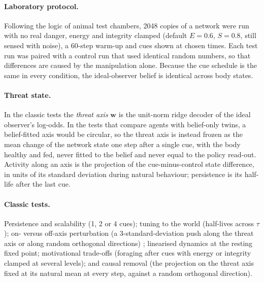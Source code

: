 \documentclass[11pt]{article}
\newcommand{\threat}{\mathbf{w}}
\begin{document}
\paragraph{Laboratory protocol.} Following the logic of animal test chambers, 2048 copies of a network were run with no real danger, energy and integrity clamped (default $E=0.6$, $S=0.8$, still sensed with noise), a 60-step warm-up and cues shown at chosen times. Each test run was paired with a control run that used identical random numbers, so that differences are caused by the manipulation alone. Because the cue schedule is the same in every condition, the ideal-observer belief is identical across body states.

\paragraph{Threat state.} In the classic tests the \emph{threat axis} $\threat$ is the unit-norm ridge decoder of the ideal observer's log-odds. In the tests that compare agents with belief-only twins, a belief-fitted axis would be circular, so the threat axis is instead frozen as the mean change of the network state one step after a single cue, with the body healthy and fed, never fitted to the belief and never equal to the policy read-out. Activity along an axis is the projection of the cue-minus-control state difference, in units of its standard deviation during natural behaviour; persistence is its half-life after the last cue.

\paragraph{Classic tests.} Persistence and scalability (1, 2 or 4 cues); tuning to the world (half-lives across $\tau$); on- versus off-axis perturbation (a 3-standard-deviation push along the threat axis or along random orthogonal directions) \cite{vinograd2024causal}; linearised dynamics at the resting fixed point; motivational trade-offs (foraging after cues with energy or integrity clamped at several levels); and causal removal (the projection on the threat axis fixed at its natural mean at every step, against a random orthogonal direction).
\end{document}
